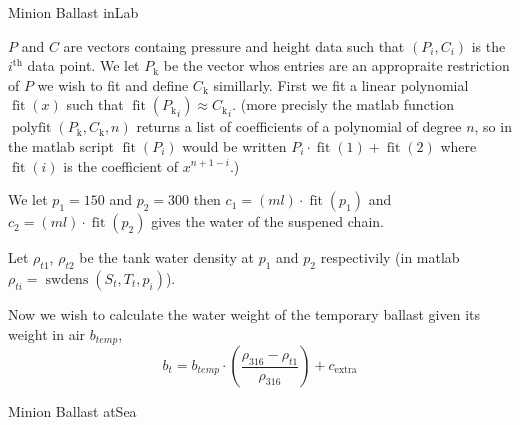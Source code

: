 \documentclass[11pt]{article}
\newcommand{\Pk}{P_\text{k}}
\newcommand{\Ck}{C_\text{k}}
\newcommand{\fit}{\operatorname{fit}}
\theoremstyle{break}
\begin{document}
\begin{section}{Minion Ballast inLab}
    
    $P$ and $C$ are vectors containg pressure and height data such that $(P_i, C_i)$ is the
    $i^{\text{th}}$ data point.  
    We let $\Pk$ be the vector whos entries are an appropraite restriction of $P$ we wish to fit and 
    define $\Ck$ simillarly.
    First we fit a linear polynomial $\fit(x)$ such that $\fit({\Pk}_i) \approx {\Ck}_i$.
    (more precisly the matlab function $\operatorname{polyfit}(\Pk,\Ck, n)$ returns a list of coefficients of a polynomial of degree $n$, so in the matlab script 
    $\fit(P_i)$ would be written $P_i \cdot \fit(1) + \fit(2)$ where $\fit(i)$ is the coefficient of $x^{n+1-i}$.)

    We let $p_1 = 150$ and $p_2 = 300$ then $c_1 = (ml) \cdot \fit(p_1)$ 
    and $c_2 = (ml) \cdot \fit(p_2)$ gives the water of the suspened chain. 

    Let $\rho_{t1}$, $\rho_{t2}$ be the tank water density at $p_1$ and $p_2$ respectivily (in matlab $\rho_{ti} = \operatorname{sw dens}(S_t, T_t, p_i)$).

    Now we wish to calculate the water weight of the temporary ballast given its weight in air $b_{temp}$,
    \[b_t = b_{temp} \cdot (\frac{\rho_{316} - \rho_{t1}}{\rho_{316}}) + c_{\text{extra}} \]
\end{section}

\begin{section}{Minion Ballast atSea}
    
\end{section}
\end{document}
